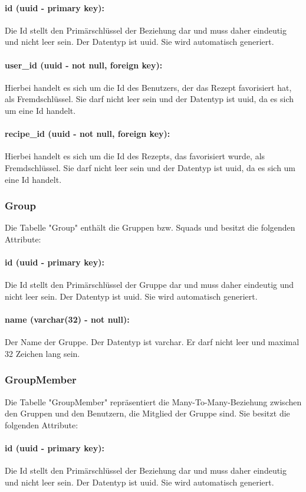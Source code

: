 \documentclass[parskip=full]{scrartcl}
\begin{document}
\paragraph{id (uuid - primary key):} Die Id stellt den Primärschlüssel der Beziehung dar und muss daher eindeutig und nicht leer sein. Der Datentyp ist \Gls{uuid}. Sie wird automatisch generiert.
\paragraph{user\_id (uuid - not null, foreign key):} Hierbei handelt es sich um die Id des Benutzers, der das Rezept favorisiert hat, als Fremdschlüssel. Sie darf nicht leer sein und der Datentyp ist \Gls{uuid}, da es sich um eine Id handelt.
\paragraph{recipe\_id (uuid - not null, foreign key):} Hierbei handelt es sich um die Id des Rezepts, das favorisiert wurde, als Fremdschlüssel. Sie darf nicht leer sein und der Datentyp ist \Gls{uuid}, da es sich um eine Id handelt.
\newpage
\subsubsection{Group}
Die Tabelle "Group" enthält die Gruppen bzw. Squads und besitzt die folgenden Attribute:
\paragraph{id (uuid - primary key):} Die Id stellt den Primärschlüssel der Gruppe dar und muss daher eindeutig und nicht leer sein. Der Datentyp ist \Gls{uuid}. Sie wird automatisch generiert.
\paragraph{name (varchar(32) - not null):} Der Name der Gruppe. Der Datentyp ist \Gls{varchar}. Er darf nicht leer und maximal 32 Zeichen lang sein.
\newpage
\subsubsection{GroupMember}
Die Tabelle "GroupMember" repräsentiert die Many-To-Many-Beziehung zwischen den Gruppen und den Benutzern, die Mitglied der Gruppe sind. Sie besitzt die folgenden Attribute:
\paragraph{id (uuid - primary key):} Die Id stellt den Primärschlüssel der Beziehung dar und muss daher eindeutig und nicht leer sein. Der Datentyp ist \Gls{uuid}. Sie wird automatisch generiert.
\end{document}
